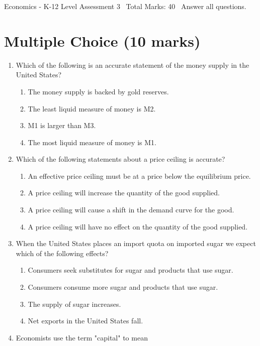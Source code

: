 \documentclass[12pt]{article}
\begin{document}
\begin{center}
Economics - K-12 Level Assessment 3 \
Total Marks: 40 \
Answer all questions.
\end{center}

\section*{Multiple Choice (10 marks)}
\begin{enumerate}[label=\arabic*.]
\item Which of the following is an accurate statement of the money supply in the United States?
\begin{enumerate}[label=(\alph*)]
    \item The money supply is backed by gold reserves.
    \item The least liquid measure of money is M2.
    \item M1 is larger than M3.
    \item The most liquid measure of money is M1.
\end{enumerate}
\item Which of the following statements about a price ceiling is accurate?
\begin{enumerate}[label=(\alph*)]
    \item An effective price ceiling must be at a price below the equilibrium price.
    \item A price ceiling will increase the quantity of the good supplied.
    \item A price ceiling will cause a shift in the demand curve for the good.
    \item A price ceiling will have no effect on the quantity of the good supplied.
\end{enumerate}
\item When the United States places an import quota on imported sugar we expect which of the
following effects?
\begin{enumerate}[label=(\alph*)]
    \item Consumers seek substitutes for sugar and products that use sugar.
    \item Consumers consume more sugar and products that use sugar.
    \item The supply of sugar increases.
    \item Net exports in the United States fall.
\end{enumerate}
\item Economists use the term "capital" to mean

\end{enumerate}
\end{document}
